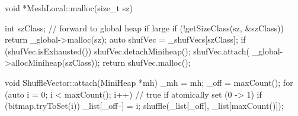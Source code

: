 
void *MeshLocal::malloc(size_t sz) {
  
  int szClass;
  // forward to global heap if large
  if (!getSizeClass(sz, &szClass))
    return _global->malloc(sz);
  auto shufVec = _shufVecs[szClass];
  if (shufVec.isExhausted()) {
    shufVec.detachMiniheap();
    shufVec.attach(
      _global->allocMiniheap(szClass));}
  return shufVec.malloc();
}

void ShuffleVector::attach(MiniHeap *mh){
  _mh = mh;
  _off = maxCount();
  for (auto i = 0; i < maxCount(); i++){
    // true if atomically set (0 -> 1)
    if (bitmap.tryToSet(i)) {
      _list[_off--] = i;
    } }
  shuffle(_list[_off],
          _list[maxCount()]);
}

